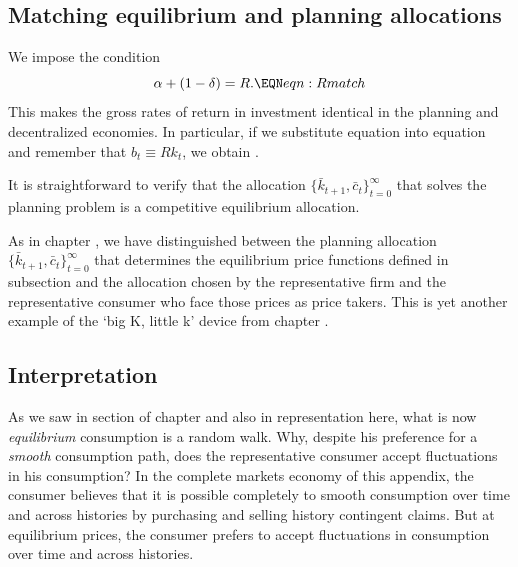 \subsection{Matching equilibrium and planning allocations}

We impose the condition
 $$\alpha + (1-\delta) = R . \EQN eqn:Rmatch $$
This makes the gross rates of return in investment identical in the planning and decentralized economies.
In particular, if we substitute equation  into equation  and
remember that $b_t \equiv R k_t$, we obtain .

It is straightforward to verify that the allocation $\{\bar k_{t+1}, \bar c_t\}_{t=0}^\infty$ that solves the planning problem
is a competitive equilibrium allocation.

As in chapter ,
we have distinguished between the planning allocation $\{\bar k_{t+1}, \bar c_t\}_{t=0}^\infty$ that determines the equilibrium
price functions  defined in subsection  and the allocation chosen by the representative firm and the
representative consumer who face those prices as price takers. This is yet another example of the `big K, little k' device
from chapter   .



\subsection{Interpretation}

As we saw in section  of chapter  and also in
representation 
 here, what is now {\it equilibrium\/} consumption is a random walk.
Why, despite his preference for a {\it smooth\/} consumption path,  does the representative consumer accept
fluctuations in his consumption?   In the complete markets economy of this appendix, the consumer believes that
 it is possible 
 completely to smooth consumption over time and across histories by purchasing and selling
history contingent claims. But at equilibrium prices, the consumer prefers to accept
 fluctuations in consumption over time and across histories.


\medskip

